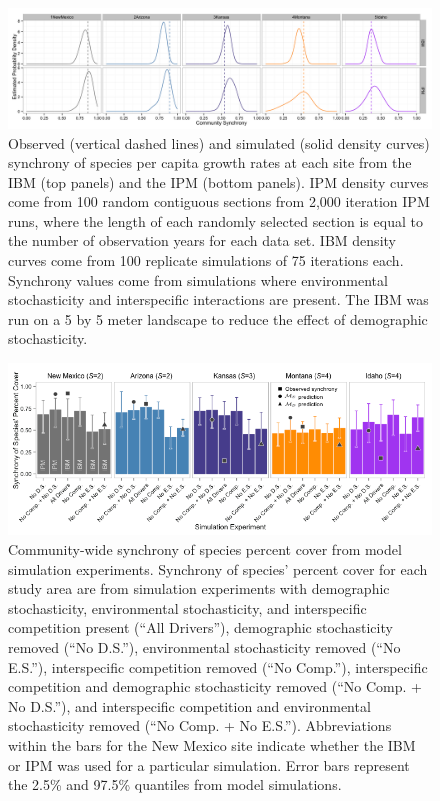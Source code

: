 \documentclass[12pt,]{article}
\begin{document}
\begin{figure}[!ht]
  \centering
      \includegraphics[width=6in]{./components/figureS1.png}
  \caption{Observed (vertical dashed lines) and simulated (solid density curves) synchrony of species per capita growth rates at each site from the IBM (top panels) and the IPM (bottom panels). IPM density curves come from 100 random contiguous sections from 2,000 iteration IPM runs, where the length of each randomly selected section is equal to the number of observation years for each data set. IBM density curves come from 100 replicate simulations of 75 iterations each. Synchrony values come from simulations where environmental stochasticity and interspecific interactions are present. The IBM was run on a 5 by 5 meter landscape to reduce the effect of demographic stochasticity.}
\end{figure}

\pagebreak{}

\begin{figure}[!ht]
  \centering
      \includegraphics[width=6in]{./components/formatted_figures/formatted_figureS2.png}
  \caption{Community-wide synchrony of species percent cover from model simulation experiments. Synchrony of species' percent cover for each study area are from simulation experiments with demographic stochasticity, environmental stochasticity, and interspecific competition present (``All Drivers''), demographic stochasticity removed (``No D.S.''), environmental stochasticity removed (``No E.S.''), interspecific competition removed (``No Comp.''), interspecific competition and demographic stochasticity removed (``No Comp. + No D.S.''), and interspecific competition and environmental stochasticity removed (``No Comp. + No E.S.''). Abbreviations within the bars for the New Mexico site indicate whether the IBM or IPM was used for a particular simulation. Error bars represent the 2.5\% and 97.5\% quantiles from model simulations.}
\end{figure}
\end{document}
